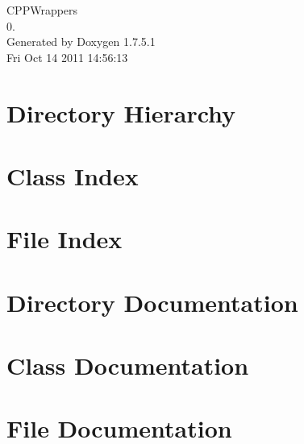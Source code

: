 \documentclass[a4paper]{book}
\begin{document}
\hypersetup{pageanchor=false,citecolor=blue}
\begin{titlepage}
\vspace*{7cm}
\begin{center}
{\Large \-C\-P\-P\-Wrappers \\[1ex]\large 0. }\\
\vspace*{1cm}
{\large \-Generated by Doxygen 1.7.5.1}\\
\vspace*{0.5cm}
{\small Fri Oct 14 2011 14:56:13}\\
\end{center}
\end{titlepage}
\clearemptydoublepage
{}
\tableofcontents
\clearemptydoublepage
{}
\hypersetup{pageanchor=true,citecolor=blue}
\chapter{\-Directory \-Hierarchy}

\chapter{\-Class \-Index}

\chapter{\-File \-Index}

\chapter{\-Directory \-Documentation}





\chapter{\-Class \-Documentation}








\chapter{\-File \-Documentation}

















\printindex
\end{document}
